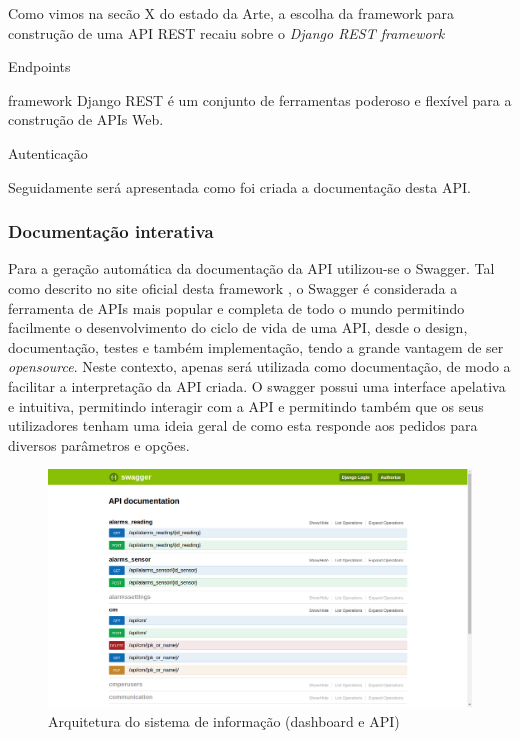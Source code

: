 Como vimos na secão X do estado da Arte, a escolha da framework para construção de uma \ac{API} \ac{REST} recaiu sobre o \textit{Django REST framework}



Endpoints 




framework Django REST é um conjunto de ferramentas poderoso e flexível para a construção de APIs Web.








Autenticação


Seguidamente será apresentada como foi criada a documentação desta API. 

\newpage
\subsubsection{Documentação interativa}


Para a geração automática da documentação da API utilizou-se o Swagger. Tal como descrito no site oficial desta framework \cite{SmartBearSoftware2017}, o Swagger é considerada a ferramenta de APIs mais popular e completa de todo o mundo permitindo facilmente o desenvolvimento do ciclo de vida de uma API, desde o design, documentação, testes e também implementação, tendo a grande vantagem de ser \textit{opensource}. Neste contexto, apenas será utilizada como documentação, de modo a facilitar a interpretação da API criada. O swagger possui uma interface apelativa e intuitiva, 
permitindo interagir com a API e permitindo também que os seus utilizadores tenham uma ideia geral de como esta responde aos pedidos para diversos parâmetros e opções. 


\begin{figure}[h]
	\centering
	\includegraphics[width=\linewidth]{prints-web/api-doc.png}
	\caption{Arquitetura do sistema de informação (dashboard e API)}
	\label{docapi}
\end{figure}



